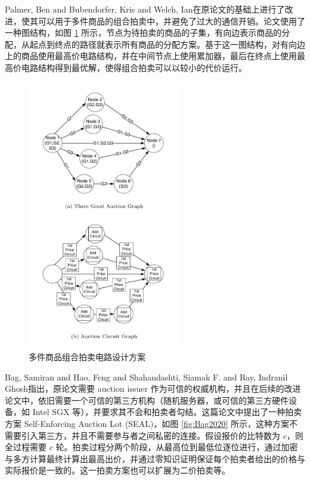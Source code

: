 Palmer, Ben and Bubendorfer, Kris and Welch, Ian\cite{Palmer2011}在原论文的基础上进行了改进，使其可以用于多件商品的组合拍卖中，并避免了过大的通信开销。论文使用了一种图结构，如图 \ref{fig:Palmer2011} 所示，节点为待拍卖的商品的子集，有向边表示商品的分配，从起点到终点的路径就表示所有商品的分配方案。基于这一图结构，对有向边上的商品使用最高价电路结构，并在中间节点上使用累加器，最后在终点上使用最高价电路结构得到最优解，使得组合拍卖可以以较小的代价运行。

\begin{figure}[h]
    \centering
    \includegraphics*[width=0.6\textwidth]{figure/Palmer2011.png}
    \caption{多件商品组合拍卖电路设计方案}
    \label{fig:Palmer2011}
\end{figure}

Bag, Samiran and Hao, Feng and Shahandashti, Siamak F. and Ray, Indranil Ghosh\cite{Bag2020}指出，原论文需要 auction issuer 作为可信的权威机构，并且在后续的改进论文中，依旧需要一个可信的第三方机构（随机服务器，或可信的第三方硬件设备，如 Intel SGX 等），并要求其不会和拍卖者勾结。这篇论文中提出了一种拍卖方案 Self-Enforcing Auction Lot (SEAL)，如图 \ref{fig:Bag2020} 所示，这种方案不需要引入第三方，并且不需要参与者之间私密的连接。假设报价的比特数为 $c$，则全过程需要 $c$ 轮。拍卖过程分两个阶段，从最高位到最低位逐位进行，通过加密与多方计算最终计算出最高出价，并通过零知识证明保证每个拍卖者给出的价格与实际报价是一致的。这一拍卖方案也可以扩展为二价拍卖等。

